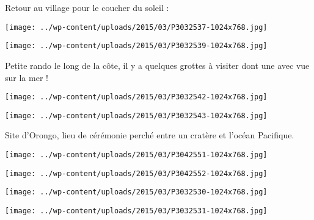 Retour au village pour le coucher du soleil :
\begin{center} \texttt{[image: ../wp-content/uploads/2015/03/P3032537-1024x768.jpg]} \end{center}
\begin{center} \texttt{[image: ../wp-content/uploads/2015/03/P3032539-1024x768.jpg]} \end{center}

 Petite rando le long de la côte, il y a quelques grottes à visiter dont une avec vue sur la mer !
\begin{center} \texttt{[image: ../wp-content/uploads/2015/03/P3032542-1024x768.jpg]} \end{center}
\begin{center} \texttt{[image: ../wp-content/uploads/2015/03/P3032543-1024x768.jpg]} \end{center}

 Site d'Orongo, lieu de cérémonie perché entre un cratère et l'océan Pacifique.
\begin{center} \texttt{[image: ../wp-content/uploads/2015/03/P3042551-1024x768.jpg]} \end{center}
\begin{center} \texttt{[image: ../wp-content/uploads/2015/03/P3042552-1024x768.jpg]} \end{center}
\begin{center} \texttt{[image: ../wp-content/uploads/2015/03/P3032530-1024x768.jpg]} \end{center}
\begin{center} \texttt{[image: ../wp-content/uploads/2015/03/P3032531-1024x768.jpg]} \end{center}
